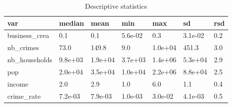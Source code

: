 \begin{table}[ht]
\centering
\begin{tabular}{lllllll}
  \hline
var & median & mean & min & max & sd & rsd \\ 
  \hline
business\_crea & 0.1 & 0.1 & 5.6e-02 & 0.3 & 3.1e-02 & 0.2 \\ 
  nb\_crimes & 73.0 & 149.8 & 9.0 & 1.0e+04 & 451.3 & 3.0 \\ 
  nb\_households & 9.8e+03 & 1.9e+04 & 3.7e+03 & 1.4e+06 & 5.3e+04 & 2.9 \\ 
  pop & 2.0e+04 & 3.5e+04 & 1.0e+04 & 2.2e+06 & 8.8e+04 & 2.5 \\ 
  income & 2.0 & 2.9 & 1.0 & 6.0 & 1.1 & 0.4 \\ 
  crime\_rate & 7.2e-03 & 7.9e-03 & 1.0e-03 & 3.0e-02 & 4.1e-03 & 0.5 \\ 
   \hline
\end{tabular}
\caption{Descriptive statistics} 
\label{desc2}
\end{table}

